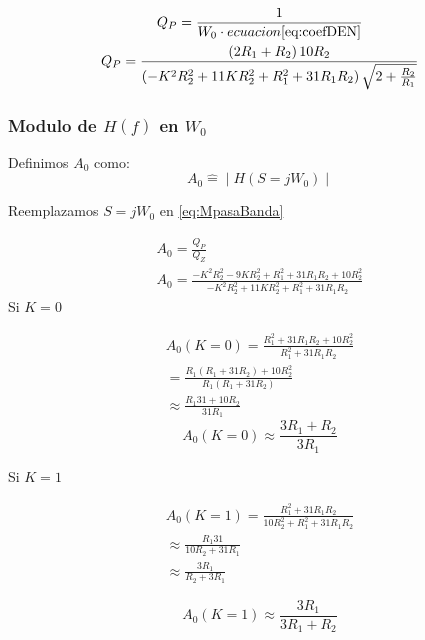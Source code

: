 \documentclass[../../tc_tp3_main.tex]{subfiles}
\begin{document}
\begin{gather}
Q_P=\frac{1}{W_0 \cdot ecuacion\ref{eq:coefDEN}}\\
Q_P=\frac{\left( 2R_1 +R_2 \right) 10 R_2 }{\left( - K ^2 R_2^2 + 11   K R_2 ^2 +  R_1^2 +31  R_1 R_2 \right)\sqrt{2+\frac{R_2}{R_1}} }
\end{gather}


\subsubsection{Modulo de $H(f)$ en $W_0$}
Definimos $A_0$ como:
\begin{equation}
A_0	\widehat{=} \mid H(S=jW_0) \mid
\end{equation}

Reemplazamos $S=jW_0$ en \ref{eq:MpasaBanda}

\begin{gather}
A_0 =\frac{Q_P}{Q_Z}\\
A_0=\frac{- K ^2 R_2^2 - 9   K R_2 ^2 +  R_1^2 +31  R_1 R_2+10  R_2^2}{ - K ^2 R_2^2 + 11   K R_2 ^2 +  R_1^2 +31  R_1 R_2 }
\end{gather}
Si $K=0$

\begin{equation}
\begin{split}
A_0(K=0) =\frac{R_1^2 +31  R_1 R_2+10  R_2^2}{  R_1^2 +31  R_1 R_2}\\
= \frac{R_1(R_1+31R_2)+10R_2^2}{R_1(R_1+31R_2)}\\
\approx \frac{R_1 31 + 10 R_2}{31 R_1}
\end{split}
\end{equation}
\begin{equation}
A_0(K=0) \approx \frac {3R_1 + R_2}{3R_1} \label{eq:A00}
\end{equation}

Si $K=1$

\begin{equation}
\begin{split}
A_0(K=1) =\frac{R_1^2 + 31R_1 R_2}{10 R_2^2 +R_1^2+31R_1 R_2} \\
\approx \frac{R_1 31}{10 R_2 + 31 R_1} \\
 \approx \frac{3 R_1}{R_2 + 3 R_1}
\end{split}
\end{equation}

\begin{equation}
A_0(K=1) \approx \frac {3R_1}{3R_1 + R_2}\label{eq:A01}
\end{equation}
\end{document}
